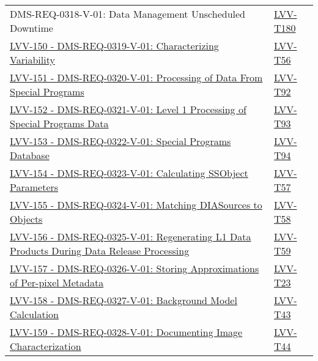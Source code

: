 \begin{longtable}[]{p{13cm}p{3cm}}
{DMS-REQ-0318-V-01: Data Management Unscheduled Downtime} &
\protect\hyperlink{lvv-t180---verify-implementation-of-data-management-unscheduled-downtime-dms-req-0318}{LVV-T180}\tabularnewline
\href{https://jira.lsstcorp.org/browse/LVV-150}{LVV-150 -
DMS-REQ-0319-V-01: Characterizing Variability} &
\protect\hyperlink{lvv-t56---verify-implementation-of-characterizing-variability-dms-req-0319}{LVV-T56}\tabularnewline
\href{https://jira.lsstcorp.org/browse/LVV-151}{LVV-151 -
DMS-REQ-0320-V-01: Processing of Data From Special Programs} &
\protect\hyperlink{lvv-t92---verify-implementation-of-processing-of-data-from-special-programs-dms-req-0320}{LVV-T92}\tabularnewline
\href{https://jira.lsstcorp.org/browse/LVV-152}{LVV-152 -
DMS-REQ-0321-V-01: Level 1 Processing of Special Programs Data} &
\protect\hyperlink{lvv-t93---verify-implementation-of-level-1-processing-of-special-programs-data-dms-req-0321}{LVV-T93}\tabularnewline
\href{https://jira.lsstcorp.org/browse/LVV-153}{LVV-153 -
DMS-REQ-0322-V-01: Special Programs Database} &
\protect\hyperlink{lvv-t94---verify-implementation-of-special-programs-database-dms-req-0322}{LVV-T94}\tabularnewline
\href{https://jira.lsstcorp.org/browse/LVV-154}{LVV-154 -
DMS-REQ-0323-V-01: Calculating SSObject Parameters} &
\protect\hyperlink{lvv-t57---verify-implementation-of-calculating-ssobject-parameters-dms-req-0323}{LVV-T57}\tabularnewline
\href{https://jira.lsstcorp.org/browse/LVV-155}{LVV-155 -
DMS-REQ-0324-V-01: Matching DIASources to Objects} &
\protect\hyperlink{lvv-t58---verify-implementation-of-matching-diasources-to-objects-dms-req-0324}{LVV-T58}\tabularnewline
\href{https://jira.lsstcorp.org/browse/LVV-156}{LVV-156 -
DMS-REQ-0325-V-01: Regenerating L1 Data Products During Data Release
Processing} &
\protect\hyperlink{lvv-t59---verify-implementation-of-regenerating-l1-data-products-during-data-release-processing-dms-req-0325}{LVV-T59}\tabularnewline
\href{https://jira.lsstcorp.org/browse/LVV-157}{LVV-157 -
DMS-REQ-0326-V-01: Storing Approximations of Per-pixel Metadata} &
\protect\hyperlink{lvv-t23---verify-implementation-of-test-storing-approximations-of-per-pixel-metadata-dms-req-0326}{LVV-T23}\tabularnewline
\href{https://jira.lsstcorp.org/browse/LVV-158}{LVV-158 -
DMS-REQ-0327-V-01: Background Model Calculation} &
\protect\hyperlink{lvv-t43---verify-implementation-of-background-model-calculation-dms-req-0327}{LVV-T43}\tabularnewline
\href{https://jira.lsstcorp.org/browse/LVV-159}{LVV-159 -
DMS-REQ-0328-V-01: Documenting Image Characterization} &
\protect\hyperlink{lvv-t44---verify-implementation-of--documenting-image-characterization-dms-req-0328}{LVV-T44}\tabularnewline

\end{longtable}
